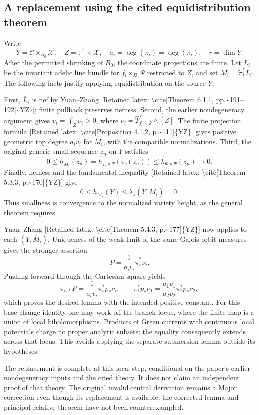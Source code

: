 \documentclass[10pt]{article}
\begin{document}
\subsection*{A replacement using the cited equidistribution theorem}
Write \[Y=\mathcal C\times_{B_0}\mathcal X,\quad
 Z=\mathbb P^1\times\mathcal X,\quad
 a_i=\deg(\widetilde\pi_i)=\deg(\pi_i),\quad r=\dim Y.\] After the permitted shrinking of \(B_0\), the coordinate projections are finite. Let \(\overline L_i\) be the invariant adelic line bundle for \(f_i\times_{B_0}\Psi\) restricted to \(Z\), and set \(\overline M_i=\widetilde\pi_i^*\overline L_i\). The following facts justify applying equidistribution on the source \(Y\).\par
First, \(\overline L_i\) is nef by Yuan–Zhang [Retained latex: \textbackslash{}cite[Theorem 6.1.1, pp.\textasciitilde{}191--192]\{YZ\}]; finite pullback preserves nefness. Second, the earlier nondegeneracy argument gives \(v_i=\int_Z\nu_i>0\), where \(\nu_i=\widehat T_{f_i\times\Psi}^{\,r}\wedge[Z]\). The finite projection formula [Retained latex: \textbackslash{}cite[Proposition 4.1.2, p.\textasciitilde{}111]\{YZ\}] gives positive geometric top degree \(a_iv_i\) for \(\overline M_i\), with the compatible normalizations. Third, the original generic small sequence \(z_n\) on \(Y\) satisfies \[0\le h_{\overline M_i}(z_n)
 =\widehat h_{f_i\times\Psi}(\widetilde\pi_i(z_n))
 \le \widehat h_{\Phi\times\Psi}(z_n)\longrightarrow0.\] Finally, nefness and the fundamental inequality [Retained latex: \textbackslash{}cite[Theorem 5.3.3, p.\textasciitilde{}170]\{YZ\}] give \[0\le h_{\overline M_i}(Y)
 \le\lambda_1(Y,\overline M_i)=0.\] Thus smallness is convergence to the normalized variety height, as the general theorem requires.\par
Yuan–Zhang [Retained latex: \textbackslash{}cite[Theorem 5.4.3, p.\textasciitilde{}177]\{YZ\}] now applies to each \((Y,\overline M_i)\). Uniqueness of the weak limit of the same Galois-orbit measures gives the stronger assertion \[P=\frac1{a_iv_i}\widetilde\pi_i^*\nu_i.\] Pushing forward through the Cartesian square yields \[\pi_{\mathcal C*}P
   =\frac1{a_iv_i}\pi_i^*p_*\nu_i,\qquad
 \pi_1^*p_*\nu_1
   =\frac{a_1v_1}{a_2v_2}\pi_2^*p_*\nu_2,\] which proves the desired lemma with the intended positive constant. For this base-change identity one may work off the branch locus, where the finite map is a union of local biholomorphisms. Products of Green currents with continuous local potentials charge no proper analytic subsets; the equality consequently extends across that locus. This avoids applying the separate submersion lemma outside its hypotheses.\par
The replacement is complete at this local step, conditional on the paper’s earlier nondegeneracy inputs and the cited theory. It does not claim an independent proof of that theory. The original invalid central derivation remains a Major correction even though its replacement is available; the corrected lemma and principal relative theorem have not been counterexampled.\par
\end{document}

